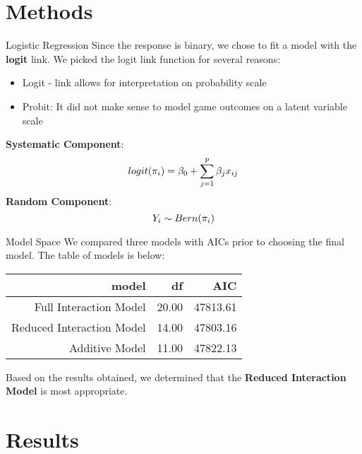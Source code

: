 \documentclass{beamer}
\begin{document}
	
	\section{Methods}
	
	\begin{frame}[t]{Logistic Regression}
	Since the response is binary, we chose to fit a model with the \textbf{logit} link. We picked the logit link function for several reasons: 
	\begin{itemize}
		\item Logit - link allows for interpretation on probability scale
		\item Probit: It did not make sense to model game outcomes on a latent variable scale
		
	\end{itemize}
\textbf{Systematic Component}: 
\begin{eqnarray} \label{eq:logit}
\centering
logit(\pi_{i})=\beta_{0}+\sum_{j=1}^{p} \beta_{j}x_{ij}
\end{eqnarray} 
\textbf{Random Component}: 
\begin{equation}
\centering
Y_i \sim Bern(\pi_i)
\end{equation}
	\end{frame}
	

	
	
\begin{frame}{Model Space}
We compared three models with AICs prior to choosing the final model. The table of models is below: 
\begin{table}[ht]
	\centering
	\begin{tabular}{rrr}
		\hline
	model	& df & AIC \\ 
		\hline
		Full Interaction Model & 20.00 & 47813.61 \\ 
		Reduced Interaction Model & 14.00 & 47803.16 \\ 
		Additive Model & 11.00 & 47822.13 \\ 
		\hline
	\end{tabular}
\end{table} 

Based on the results obtained, we determined that the \textbf{Reduced Interaction Model} is most appropriate.
\end{frame}
	
	
\section{Results}
\end{document}
